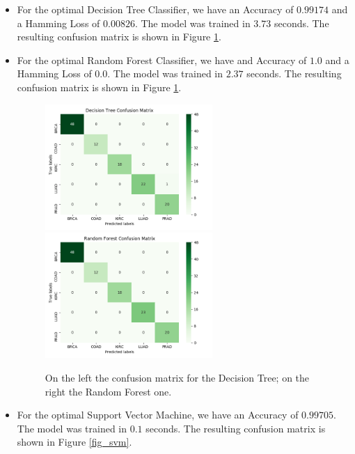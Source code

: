 \documentclass[12pt]{article}
\begin{document}
\begin{itemize}
\item For the optimal Decision Tree Classifier, we have an Accuracy of $0.99174$ and a Hamming Loss of $0.00826$. The model was trained in $3.73$ seconds. 
The resulting confusion matrix is shown in Figure \ref{fig_treeandforest}. 

\item For the optimal Random Forest Classifier, we have and Accuracy of $1.0$ and a Hamming Loss of $0.0$. The model was trained in $2.37$ seconds. 
The resulting confusion matrix is shown in Figure \ref{fig_treeandforest}. 

\begin{figure}
\centering
\advance\leftskip-4cm
\advance\rightskip-4cm
\includegraphics[width=0.60\textwidth]{img/dt.png}
\includegraphics[width=0.60\textwidth]{img/rf.png}
\caption{On the left the confusion matrix for the Decision Tree; on the right the Random Forest one.}
\label{fig_treeandforest}
\end{figure}

\newpage
\item For the optimal Support Vector Machine, we have an Accuracy of $0.99705$. The model was trained in $0.1$ seconds.
The resulting confusion matrix is shown in Figure \ref{fig_svm}. 


\end{itemize}
\end{document}
